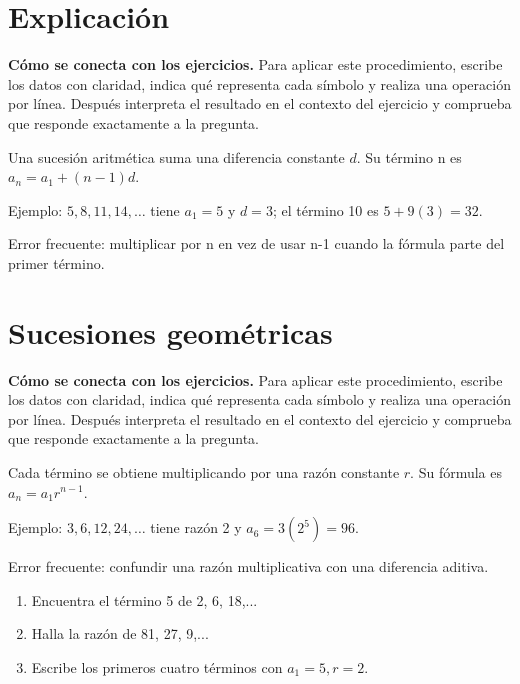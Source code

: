 \documentclass[10pt,oneside,openany]{book}
\begin{document}
\section{Explicación}

\textbf{Cómo se conecta con los ejercicios.} Para aplicar este procedimiento, escribe los datos con claridad, indica qué representa cada símbolo y realiza una operación por línea. Después interpreta el resultado en el contexto del ejercicio y comprueba que responde exactamente a la pregunta.

Una sucesión aritmética suma una diferencia constante $d$. Su término n es $a_n=a_1+(n-1)d$.



\begin{ejemplo}
Ejemplo: $5,8,11,14,\ldots$ tiene $a_1=5$ y $d=3$; el término 10 es $5+9(3)=32$.
\end{ejemplo}

\begin{ojo}
Error frecuente: multiplicar por n en vez de usar n-1 cuando la fórmula parte del primer término.
\end{ojo}



\section{Sucesiones geométricas}

\textbf{Cómo se conecta con los ejercicios.} Para aplicar este procedimiento, escribe los datos con claridad, indica qué representa cada símbolo y realiza una operación por línea. Después interpreta el resultado en el contexto del ejercicio y comprueba que responde exactamente a la pregunta.

Cada término se obtiene multiplicando por una razón constante $r$. Su fórmula es $a_n=a_1r^{n-1}$.

\begin{ejemplo}
Ejemplo: $3,6,12,24,\ldots$ tiene razón 2 y $a_6=3(2^5)=96$.
\end{ejemplo}

\begin{ojo}
Error frecuente: confundir una razón multiplicativa con una diferencia aditiva.
\end{ojo}

\begin{practica}

\begin{enumerate}

\item Encuentra el término 5 de 2, 6, 18,...

\item Halla la razón de 81, 27, 9,...

\item Escribe los primeros cuatro términos con $a_1=5,r=2$.

\end{enumerate}

\end{practica}
\end{document}
